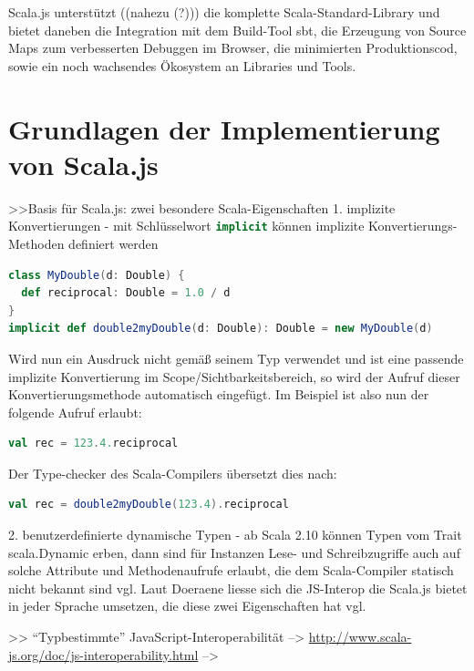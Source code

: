 \documentclass[a4paper, 12pt, hidelinks, listof=totoc, listoftables=totoc, bibliography=totoc]{scrreprt}
\newcommand{\scala}[1]{\lstinline[language=Scala, style=inline]|#1|}
\begin{document}
Scala.js unterstützt ((nahezu (?))) die komplette Scala-Standard-Library und bietet daneben die Integration mit dem Build-Tool sbt, die Erzeugung von Source Maps zum verbesserten Debuggen im Browser, die minimierten Produktionscod, sowie ein noch wachsendes Ökosystem an Libraries und Tools.


\section{Grundlagen der Implementierung von Scala.js}


>>Basis für Scala.js: zwei besondere Scala-Eigenschaften
1. implizite Konvertierungen
	- mit Schlüsselwort \scala{implicit} können implizite Konvertierungs-Methoden definiert werden
\begin{lstlisting}[language=Scala]
class MyDouble(d: Double) {
  def reciprocal: Double = 1.0 / d
}
implicit def double2myDouble(d: Double): Double = new MyDouble(d)
\end{lstlisting}

Wird nun ein Ausdruck nicht gemäß seinem Typ verwendet und ist eine passende implizite Konvertierung im Scope/Sichtbarkeitsbereich, so wird der Aufruf dieser Konvertierungsmethode automatisch eingefügt.
Im Beispiel ist also nun der folgende Aufruf erlaubt:

\begin{lstlisting}[language=Scala]
val rec = 123.4.reciprocal
\end{lstlisting}

Der Type-checker des Scala-Compilers übersetzt dies nach:

\begin{lstlisting}[language=Scala]
val rec = double2myDouble(123.4).reciprocal
\end{lstlisting}
2. benutzerdefinierte dynamische Typen
	- ab Scala 2.10 können Typen vom Trait scala.Dynamic erben, dann sind für Instanzen Lese- und Schreibzugriffe auch auf solche Attribute und Methodenaufrufe erlaubt, die dem Scala-Compiler statisch nicht bekannt sind
vgl. \cite[S. 3]{doeraene2013.TDI}
Laut Doeraene liesse sich die JS-Interop die Scala.js bietet in jeder Sprache umsetzen, die diese zwei Eigenschaften hat
vgl. \cite[S. 3]{doeraene2013.TDI}







>> "`Typbestimmte"' JavaScript-Interoperabilität
-->  \url{http://www.scala-js.org/doc/js-interoperability.html}
-->  \cite{doeraene2013.TDI}
\end{document}
